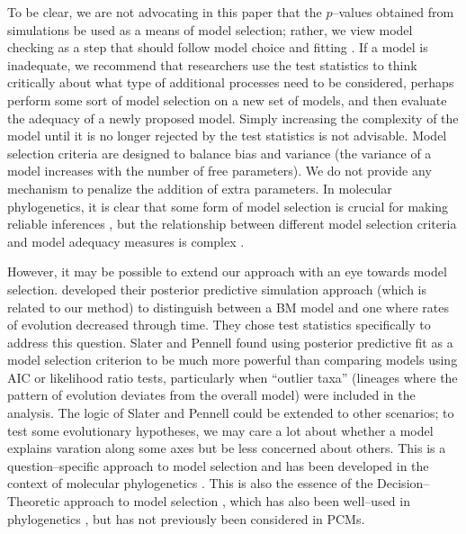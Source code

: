 \documentclass[a4paper,11pt]{article}
\begin{document}
To be clear, we are not advocating in this paper that the $p$--values obtained from simulations be used as a means of model selection; rather, we view model checking as a step that should follow model choice and fitting \citep[see][ch. 6, for discussion]{Gelmanbook}. If a model is inadequate, we recommend that researchers use the test statistics to think critically about what type of additional processes need to be considered, perhaps perform some sort of model selection on a new set of models, and then evaluate the adequacy of a newly proposed model. Simply increasing the complexity of the model until it is no longer rejected by the test statistics is not advisable.  Model selection criteria are designed to balance bias and variance (the variance of a model increases with the number of free parameters). We do not provide any mechanism to penalize the addition of extra parameters. In molecular phylogenetics, it is clear that some form of model selection is crucial for making reliable inferences \citep{SullivanJoyce2005, Ripplinger2008}, but the relationship between different model selection criteria and model adequacy measures is complex \citep{Ripplinger2010, Boettiger2012}. 

However, it may be possible to extend our approach with an eye towards model selection. \citet{SlaterPennell} developed their posterior predictive simulation approach (which is related to our method) to distinguish between a BM model and one where rates of evolution decreased through time. They chose test statistics \citep[including the node--height test][$S_{\text{HGT}}$ is our study]{FreckletonHarvey2006} specifically to address this question. Slater and Pennell found using posterior predictive fit as a model selection criterion to be much more powerful than comparing models using AIC or likelihood ratio tests, particularly when ``outlier taxa'' (lineages where the pattern of evolution deviates from the overall model) were included in the analysis. The logic of Slater and Pennell could be extended to other scenarios; to test some evolutionary hypotheses, we may care a lot about whether a model explains varation along some axes but be less concerned about others. This is a question--specific approach to model selection and has been developed in the context of molecular phylogenetics \citep{Bollback2002, Lewis2013}. This is also the essence of the Decision--Theoretic approach to model selection \citep{Robert2007}, which has also been well--used in phylogenetics \citep{Minin2003}, but has not previously been considered in PCMs.
\end{document}
